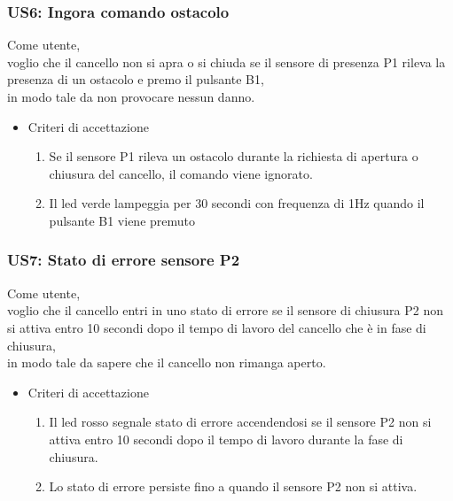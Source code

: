\documentclass[12pt]{article}
\begin{document}
\subsubsection{US6: Ingora comando ostacolo}
Come utente, \\
voglio che il cancello non si apra o si chiuda se il sensore di presenza P1 rileva la presenza di un ostacolo e premo il pulsante B1,\\
in modo tale da non provocare nessun danno.
\begin{itemize}
    \item Criteri di accettazione
    \begin{enumerate}
        \item Se il sensore P1 rileva un ostacolo durante la richiesta di apertura o chiusura del cancello, il comando viene ignorato.
        \item Il led verde lampeggia per 30 secondi con frequenza di 1Hz quando il pulsante B1 viene premuto
   \end{enumerate}
\end{itemize}
\subsubsection{US7: Stato di errore sensore P2}
Come utente, \\
voglio che il cancello entri in uno stato di errore se il sensore di chiusura P2 non si attiva entro 10 secondi dopo il tempo di lavoro del cancello che è in fase di chiusura,\\
in modo tale da sapere che il cancello non rimanga aperto.
\begin{itemize}
    \item Criteri di accettazione
    \begin{enumerate}
        \item Il led rosso segnale stato di errore accendendosi se il sensore P2 non si attiva entro 10 secondi dopo il tempo di lavoro durante la fase di chiusura.
        \item Lo stato di errore persiste fino a quando il sensore P2 non si attiva.
    \end{enumerate}
\end{itemize}
\end{document}
